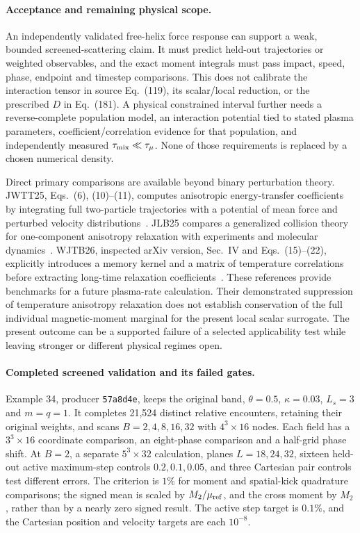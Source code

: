 \documentclass[11pt,letterpaper]{article}
\begin{document}
\paragraph{Acceptance and remaining physical scope.}
An independently validated free-helix force response can support a weak,
bounded screened-scattering claim. It must predict held-out trajectories or
weighted observables, and the exact moment integrals must pass impact,
speed, phase, endpoint and timestep comparisons. This does not calibrate
the interaction tensor in source Eq.~(119), its scalar/local reduction, or
the prescribed $D$ in Eq.~(181). A physical constrained interval further
needs a reverse-complete population model, an interaction potential tied
to stated plasma parameters, coefficient/correlation evidence for that
population, and independently measured $\tau_{\rm mix}\ll\tau_\mu$.
None of those requirements is replaced by a chosen numerical density.

Direct primary comparisons are available beyond binary perturbation
theory. JWTT25, Eqs.~(6), (10)--(11), computes anisotropic energy-transfer
coefficients by integrating full two-particle trajectories with a potential
of mean force and perturbed velocity distributions~\cite{JWTT25}.
JLB25 compares a generalized collision theory for one-component anisotropy
relaxation with experiments and molecular dynamics~\cite{JLB25}.
WJTB26, inspected arXiv version, Sec.~IV and Eqs.~(15)--(22), explicitly
introduces a memory kernel and a matrix of temperature correlations before
extracting long-time relaxation coefficients~\cite{WJTB26}. These references
provide benchmarks for a future plasma-rate calculation. Their demonstrated
suppression of temperature anisotropy relaxation does not establish
conservation of the full individual magnetic-moment marginal for the
present local scalar surrogate. The present outcome can be a supported
failure of a selected applicability test while leaving stronger or different
physical regimes open.

\paragraph{Completed screened validation and its failed gates.}
Example 34, producer \texttt{57a8d4e}, keeps the original band, $\theta=0.5$,
$\kappa=0.03$, $L_s=3$ and $m=q=1$. It completes 21,524 distinct
relative encounters, retaining their original weights, and scans
$B=2,4,8,16,32$ with $4^3\times16$ nodes. Each field has a
$3^3\times16$ coordinate comparison, an eight-phase comparison and a
half-grid phase shift. At $B=2$, a separate $5^3\times32$ calculation,
planes $L=18,24,32$, sixteen held-out active maximum-step controls
$0.2,0.1,0.05$, and three Cartesian pair controls test different errors.
The criterion is $1\%$ for moment and spatial-kick quadrature comparisons;
the signed mean is scaled by $M_2/\mu_{\rm ref}$, and the cross moment by
$M_2$, rather than by a nearly zero signed result. The active step target
is $0.1\%$, and the Cartesian position and velocity targets are each
$10^{-8}$.
\end{document}
